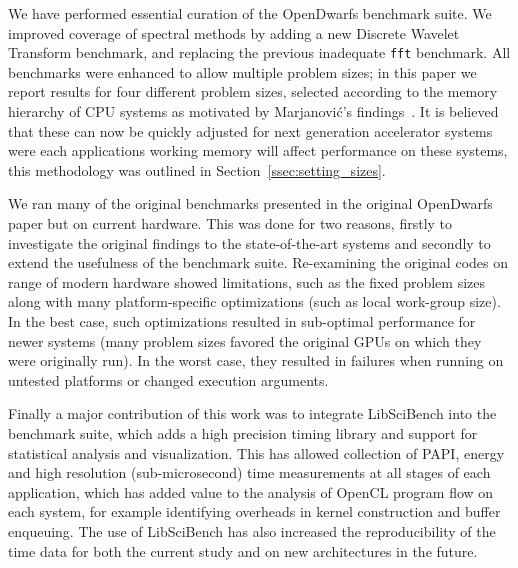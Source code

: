 \documentclass[../document.tex]{subfiles}
\begin{document}
\label{sec:conclusions}

We have performed essential curation of the OpenDwarfs benchmark suite.
We improved coverage of spectral methods by adding a new Discrete Wavelet Transform benchmark, and replacing the previous inadequate {\tt fft} benchmark.
All benchmarks were enhanced to allow multiple problem sizes; in this paper we report results for four different problem sizes, selected according to the memory hierarchy of CPU systems as motivated by Marjanovi{\'c}'s findings~\cite{marjanovic2016hpc}.
It is believed that these can now be quickly adjusted for next generation accelerator systems were each applications working memory will affect performance on these systems, this methodology was outlined in Section~\ref{ssec:setting_sizes}.

We ran many of the original benchmarks presented in the original OpenDwarfs~\cite{krommydas2016opendwarfs} paper but on current hardware.
This was done for two reasons, firstly to investigate the original findings to the state-of-the-art systems and secondly to extend the usefulness of the benchmark suite.
Re-examining the original codes on range of modern hardware showed limitations, such as the fixed problem sizes along with many platform-specific optimizations (such as local work-group size).
In the best case, such optimizations resulted in sub-optimal performance for newer systems (many problem sizes favored the original GPUs on which they were originally run).
In the worst case, they resulted in failures when running on untested platforms or changed execution arguments.

Finally a major contribution of this work was to integrate LibSciBench into the benchmark suite, which adds a high precision timing library and support for statistical analysis and visualization.
This has allowed collection of PAPI, energy and high resolution (sub-microsecond) time measurements at all stages of each application, which has added value to the analysis of OpenCL program flow on each system, for example identifying overheads in kernel construction and buffer enqueuing.
The use of LibSciBench has also increased the reproducibility of the time data for both the current study and on new architectures in the future.
\end{document}
